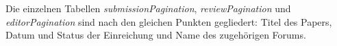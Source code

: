\begin{samepage}
    Die einzelnen Tabellen \emph{submissionPagination}, \emph{reviewPagination} und \emph{editorPagination} sind nach den gleichen Punkten gegliedert: Titel des Papers, Datum und Status der Einreichung und Name des zugehörigen Forums.

\end{samepage}

